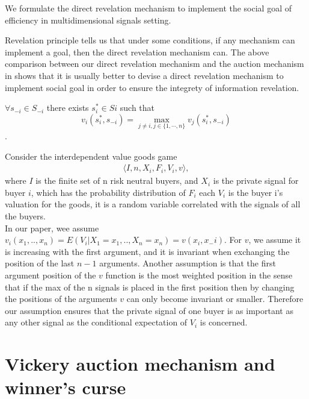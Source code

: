 \begin{prop}
We formulate the direct revelation mechanism to implement the social goal of efficiency in multidimensional signals setting.  

Revelation principle tells us that under some conditions, if any mechanism can implement a goal, then the direct revelation mechanism
can. The above comparison between our direct revelation mechanism and  the auction mechanism in \parencite{Maskin00} shows that it is
usually better to devise a direct revelation mechanism to implement social goal in order to ensure the integrety of information 
revelation.


\begin{assumption}
 $\forall s_{-i} \in S_{-i}$
there exists $ s_i^* \in Si$ such that 
$$v_i(s_i^*,s_{-i}) = \max_{j\neq i, j \in \{1,\cdots,n\}}v_j(s_i^*, s_{-i})$$.

\end{assumption}

 
Consider the interdependent value goods game
\begin{eqnarray*}
\langle I,n,X_i,F_i,V_i,v\rangle,
\end{eqnarray*}
where $I$ is the finite set of n risk neutral buyers, and 
$X_i$ is the private signal for buyer $i$, which has the probability distribution of $F_i$
each $V_i$ is the buyer i's valuation for the goods, it is a random variable correlated with
the signals of all the buyers.
\\
In our paper, wee assume $v_i(x_1,..,x_n)=E(V_i|X_1=x_1,..,X_n=x_n)=v(x_i, x_-i)$. For $v$, we assume 
it is increasing with the first argument, and it is invariant when exchanging the position of the last $n-1$ arguments. Another
assumption is that the first argument position of the $v$ function is the most weighted position in the sense that if the max 
of the n signals is placed in the first position then by changing the positions of the arguments $v$ can only become invariant or smaller. 
Therefore our assumption ensures that the private signal of one buyer is as important as any other signal as the conditional expectation of 
$V_i$ is concerned.







\section{Vickery auction mechanism and winner's curse }


\end{prop}
